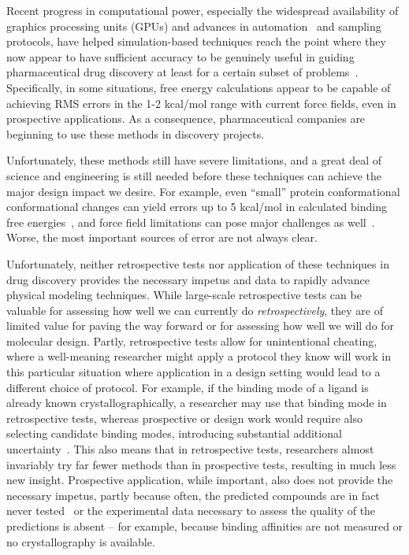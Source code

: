 \documentclass[11pt]{article}
\begin{document}
Recent progress in computational power, especially the widespread availability of graphics processing units (GPUs) and advances in automation~\cite{liu_lead_2013} and sampling protocols, have helped simulation-based techniques reach the point where they now appear to have sufficient accuracy to be genuinely useful in guiding pharmaceutical drug discovery at least for a certain subset of problems~\cite{mikulskis_large-scale_2014, homeyer_binding_2014, sherborne_preprint_2016,  schrodinger_accurate_2015, christ_binding_2016, cui_affinity_2016, verras_free_2016}.
Specifically, in some situations, free energy calculations appear to be capable of achieving RMS errors in the 1-2 kcal/mol range with current force fields, even in prospective applications.
As a consequence, pharmaceutical companies are beginning to use these methods in discovery projects.

Unfortunately, these methods still have severe limitations, and a great deal of science and engineering is still needed before these techniques can achieve the major design impact we desire. 
For example, even ``small'' protein conformational conformational changes can yield errors up to 5 kcal/mol in calculated binding free energies~\cite{lim_sensitivity_2016}, and force field limitations can pose major challenges as well~\cite{rocklin_blind_2013}. 
Worse, the most important sources of error are not always clear.

Unfortunately, neither retrospective tests nor application of these techniques in drug discovery provides the necessary impetus and data to rapidly advance physical modeling techniques.
While large-scale retrospective tests can be valuable for assessing how well we can currently do \emph{retrospectively}, they are of limited value for paving the way forward or for assessing how well we will do for molecular design.
Partly, retrospective tests allow for unintentional cheating, where a well-meaning researcher might apply a protocol they know will work in this particular situation where application in a design setting would lead to a different choice of protocol.
For example, if the binding mode of a ligand is already known crystallographically, a researcher may use that binding mode in retrospective tests, whereas prospective or design work would require also selecting candidate binding modes, introducing substantial additional uncertainty~\cite{mobley_predicting_2007, boyce_predicting_2009, mobley_perspective_2012}.
This also means that in retrospective tests, researchers almost invariably try far fewer methods than in prospective tests, resulting in much less new insight.
Prospective application, while important, also does not provide the necessary impetus, partly because often, the predicted compounds are in fact never tested~\cite{christ_binding_2016} or the experimental data necessary to assess the quality of the predictions is absent -- for example, because binding affinities are not measured or no crystallography is available. 
\end{document}
